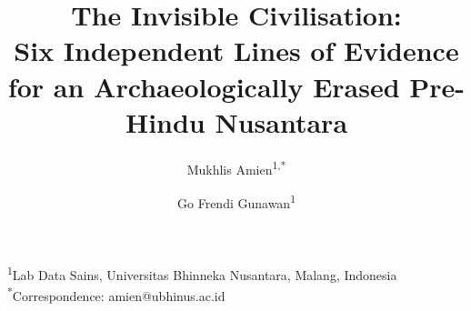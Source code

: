 \documentclass[12pt,a4paper]{article}
\begin{document}
\title{The Invisible Civilisation:\\Six Independent Lines of Evidence for an Archaeologically Erased Pre-Hindu Nusantara}

\author{Mukhlis Amien\textsuperscript{1,*} \and Go Frendi Gunawan\textsuperscript{1}}

\date{}

\maketitle

\noindent\textsuperscript{1}Lab Data Sains, Universitas Bhinneka Nusantara, Malang, Indonesia\\
\textsuperscript{*}Correspondence: amien@ubhinus.ac.id

\begin{abstract}

\end{abstract}
\end{document}
